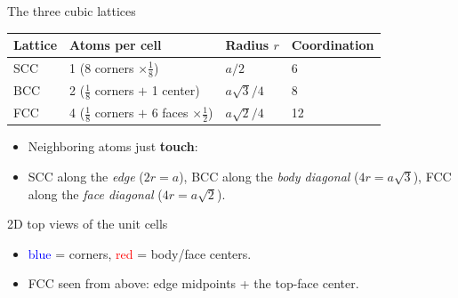 \documentclass[aspectratio=169]{beamer}
\begin{document}
\begin{frame}{The three cubic lattices}
  \begin{table}
    \small
    \begin{tabular}{@{}llll@{}}
      \toprule
      Lattice & Atoms per cell & Radius $r$ & Coordination \\
      \midrule
      SCC & 1 (8 corners $\times \frac{1}{8}$) & $a/2$ & 6 \\
      BCC & 2 ($\frac{1}{8}$ corners $+$ 1 center) & $a\sqrt{3}/4$ & 8 \\
      FCC & 4 ($\frac{1}{8}$ corners $+$ 6 faces $\times \frac{1}{2}$) & $a\sqrt{2}/4$ & 12 \\
      \bottomrule
    \end{tabular}
  \end{table}
  \vspace{0.3cm}
  \begin{itemize}
    \item Neighboring atoms just \textbf{touch}:
    \item SCC along the \emph{edge} ($2r=a$), BCC along the \emph{body
          diagonal} ($4r=a\sqrt{3}$), FCC along the \emph{face diagonal} ($4r=a\sqrt{2}$).
  \end{itemize}
\end{frame}

\begin{frame}[fragile]{2D top views of the unit cells}
  \begin{center}
  \end{center}
  \vspace{0.2cm}
  \begin{itemize}
    \item \textcolor{blue}{blue} = corners, \textcolor{red}{red} = body/face centers.
    \item FCC seen from above: edge midpoints + the top-face center.
  \end{itemize}
\end{frame}
\end{document}
